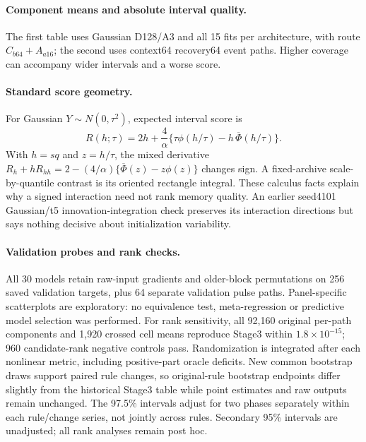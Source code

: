 \documentclass{article}
\begin{document}
\paragraph{Component means and absolute interval quality.}
The first table uses Gaussian D128/A3 and all 15 fits per architecture,
with route $C_{b64}+A_{a16}$; the second uses context64 recovery64 event
paths. Higher coverage can accompany wider intervals and a worse score.
\begin{center}
\ComponentReadout
\end{center}
\begin{center}
\AbsoluteReadout
\end{center}

\paragraph{Standard score geometry.}
For Gaussian $Y\sim N(0,\tau^2)$, expected interval score is
\[
 R(h;\tau)=2h+\frac{4}{\alpha}
 \{\tau\phi(h/\tau)-h\,\overline\Phi(h/\tau)\}.
\]
With $h=sq$ and $z=h/\tau$, the mixed derivative
$R_h+hR_{hh}=2-(4/\alpha)\{\overline\Phi(z)-z\phi(z)\}$ changes sign.
A fixed-archive scale-by-quantile contrast is its oriented rectangle
integral. These calculus facts explain why a signed interaction need not
rank memory quality. An earlier seed4101 Gaussian/t5 innovation-integration
check preserves its interaction directions but says nothing decisive
about initialization variability.

\paragraph{Validation probes and rank checks.}
All 30 models retain raw-input gradients and older-block permutations on
256 saved validation targets, plus 64 separate validation pulse paths.
Panel-specific scatterplots are exploratory: no equivalence test,
meta-regression or predictive model selection was performed.
For rank sensitivity, all 92,160 original per-path components and 1,920
crossed cell means reproduce Stage3 within $1.8\times10^{-15}$; 960
candidate-rank negative controls pass. Randomization is integrated after
each nonlinear metric, including positive-part oracle deficits. New common
bootstrap draws support paired rule changes, so original-rule bootstrap
endpoints differ slightly from the historical Stage3 table while point
estimates and raw outputs remain unchanged. The 97.5\% intervals adjust
for two phases separately within each rule/change series, not jointly
across rules. Secondary 95\% intervals are unadjusted; all rank analyses
remain post hoc.
\end{document}
